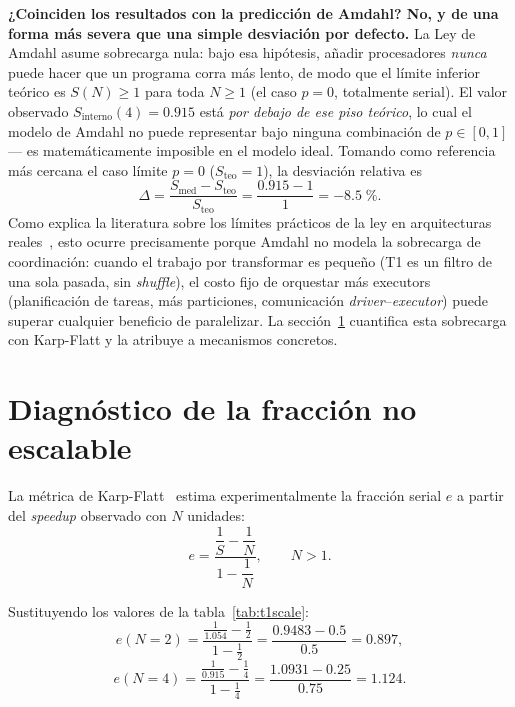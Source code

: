 \documentclass[11pt,a4paper]{article}
\begin{document}
\textbf{¿Coinciden los resultados con la predicción de Amdahl? No, y de una forma
más severa que una simple desviación por defecto.} La Ley de Amdahl asume
sobrecarga nula: bajo esa hipótesis, añadir procesadores \emph{nunca} puede hacer
que un programa corra más lento, de modo que el límite inferior teórico es
$S(N) \geq 1$ para toda $N \geq 1$ (el caso $p=0$, totalmente serial). El valor
observado $S_{\text{interno}}(4) = 0.915$ está \emph{por debajo de ese piso
teórico}, lo cual el modelo de Amdahl no puede representar bajo ninguna
combinación de $p \in [0,1]$ --- es matemáticamente imposible en el modelo ideal.
Tomando como referencia más cercana el caso límite $p=0$ ($S_{\text{teo}}=1$), la
desviación relativa es
\begin{equation}
  \Delta = \frac{S_{\text{med}} - S_{\text{teo}}}{S_{\text{teo}}}
         = \frac{0.915 - 1}{1} = -8.5 \; \si{\percent}.
  \label{eq:delta}
\end{equation}
Como explica la literatura sobre los límites prácticos de la ley en arquitecturas
reales~\cite{hillmarty2008}, esto ocurre precisamente porque Amdahl no modela la
sobrecarga de coordinación: cuando el trabajo por transformar es pequeño (T1 es un
filtro de una sola pasada, sin \textit{shuffle}), el costo fijo de orquestar más
executors (planificación de tareas, más particiones, comunicación
\textit{driver}--\textit{executor}) puede superar cualquier beneficio de
paralelizar. La sección~\ref{sec:diagnostico} cuantifica esta sobrecarga con
Karp-Flatt y la atribuye a mecanismos concretos.

\section{Diagnóstico de la fracción no escalable}
\label{sec:diagnostico}

La métrica de Karp-Flatt~\cite{karpflatt1990} estima experimentalmente la fracción
serial $e$ a partir del \textit{speedup} observado con $N$ unidades:
\begin{equation}
  e = \frac{\dfrac{1}{S} - \dfrac{1}{N}}{1 - \dfrac{1}{N}}, \qquad N > 1.
  \label{eq:karpflatt}
\end{equation}

Sustituyendo los valores de la tabla~\ref{tab:t1scale}:
\[
  e(N{=}2) = \frac{\frac{1}{1.054} - \frac{1}{2}}{1 - \frac{1}{2}}
           = \frac{0.9483 - 0.5}{0.5} = 0.897,
\]
\[
  e(N{=}4) = \frac{\frac{1}{0.915} - \frac{1}{4}}{1 - \frac{1}{4}}
           = \frac{1.0931 - 0.25}{0.75} = 1.124.
\]
\end{document}
